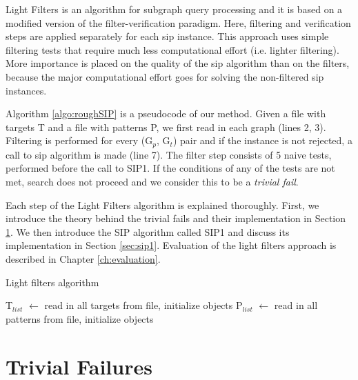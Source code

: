 \documentclass{l4proj}
\begin{document}
Light Filters is an algorithm for subgraph query processing and it is based on a modified version of the filter-verification paradigm. Here, filtering and verification steps are applied separately for each \gls{sip} instance. This approach uses simple filtering tests that require much less computational effort (i.e. lighter filtering). More importance is placed on the quality of the \gls{sip} algorithm than on the filters, because the major computational effort goes for solving the non-filtered \gls{sip} instances. 

Algorithm \ref{algo:roughSIP} is a pseudocode of our method. Given a file with targets T and a file with patterns P, we first read in each graph (lines 2, 3). Filtering is performed for every (G$_{p}$, G$_{t}$) pair and if the instance is not rejected, a call to \gls{sip} algorithm is made (line 7). The filter step consists of 5 naive tests, performed before the call to SIP1. If the conditions of any of the tests are not met, search does not proceed and we consider this to be a \textit{trivial fail}. 

Each step of the Light Filters algorithm is explained thoroughly. First, we introduce the theory behind the trivial fails and their implementation in Section \ref{sec:trivialFails}. We then introduce the SIP algorithm called SIP1 and discuss its implementation in Section \ref{sec:sip1}. Evaluation of the light filters approach is described in Chapter \ref{ch:evaluation}.

\begin{algorithm}
\centering
\caption{Light filters algorithm}
\label{algo:roughSIP}
\begin{algorithmic}[1]
 
\State T$_{list}$ $\gets$ read in all targets from file, initialize objects
\State P$_{list}$ $\gets$ read in all patterns from file, initialize objects
		 
    	\EndIf
    \EndFor
\EndFor
\EndProcedure
\end{algorithmic}
\end{algorithm}

\section{Trivial Failures}
\label{sec:trivialFails}
\end{document}
